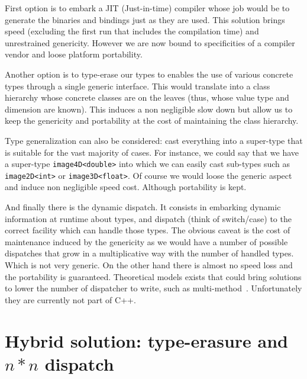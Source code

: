 First option is to embark a JIT (Just-in-time) compiler whose job would be to generate the binaries and bindings just as
they are used. This solution brings speed (excluding the first run that includes the compilation time) and unrestrained
genericity. However we are now bound to specificities of a compiler vendor and loose platform portability.

Another option is to type-erase our types to enables the use of various concrete types through a single generic
interface. This would translate into a class hierarchy whose concrete classes are on the leaves (thus, whose value type
and dimension are known). This induces a non negligible slow down but allow us to keep the genericity and portability at
the cost of maintaining the class hierarchy.

Type generalization can also be considered: cast everything into a super-type that is suitable for the vast majority of
cases. For instance, we could say that we have a super-type \texttt{image4D<double>} into which we can easily cast
sub-types such as \texttt{image2D<int>} or \texttt{image3D<float>}. Of course we would loose the generic aspect and
induce non negligible speed cost. Although portability is kept.

And finally there is the dynamic dispatch. It consists in embarking dynamic information at runtime about types, and
dispatch (think of switch/case) to the correct facility which can handle those types. The obvious caveat is the cost of
maintenance induced by the genericity as we would have a number of possible dispatches that grow in a multiplicative way
with the number of handled types. Which is not very generic. On the other hand there is almost no speed loss and the
portability is guaranteed. Theoretical models exists that could bring solutions to lower the number of dispatcher to
write, such as multi-method~\cite{pirkelbauer.2010.multimethods}. Unfortunately they are currently not part of C++.



\section{Hybrid solution: type-erasure and $n*n$ dispatch}


